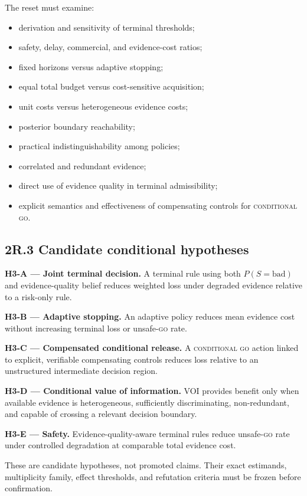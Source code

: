 \documentclass[11pt,a4paper]{article}
\newcommand{\go}{\textsc{go}}
\newcommand{\cgo}{\textsc{conditional go}}
\begin{document}
The reset must examine:
\begin{itemize}
  \item derivation and sensitivity of terminal thresholds;
  \item safety, delay, commercial, and evidence-cost ratios;
  \item fixed horizons versus adaptive stopping;
  \item equal total budget versus cost-sensitive acquisition;
  \item unit costs versus heterogeneous evidence costs;
  \item posterior boundary reachability;
  \item practical indistinguishability among policies;
  \item correlated and redundant evidence;
  \item direct use of evidence quality in terminal admissibility;
  \item explicit semantics and effectiveness of compensating controls for \cgo{}.
\end{itemize}

\subsection{2R.3 Candidate conditional hypotheses}

\textbf{H3-A --- Joint terminal decision.} A terminal rule using both $P(S=\mathrm{bad})$ and evidence-quality belief reduces weighted loss under degraded evidence relative to a risk-only rule.

\textbf{H3-B --- Adaptive stopping.} An adaptive policy reduces mean evidence cost without increasing terminal loss or unsafe-\go{} rate.

\textbf{H3-C --- Compensated conditional release.} A \cgo{} action linked to explicit, verifiable compensating controls reduces loss relative to an unstructured intermediate decision region.

\textbf{H3-D --- Conditional value of information.} VOI provides benefit only when available evidence is heterogeneous, sufficiently discriminating, non-redundant, and capable of crossing a relevant decision boundary.

\textbf{H3-E --- Safety.} Evidence-quality-aware terminal rules reduce unsafe-\go{} rate under controlled degradation at comparable total evidence cost.

These are candidate hypotheses, not promoted claims. Their exact estimands, multiplicity family, effect thresholds, and refutation criteria must be frozen before confirmation.
\end{document}

